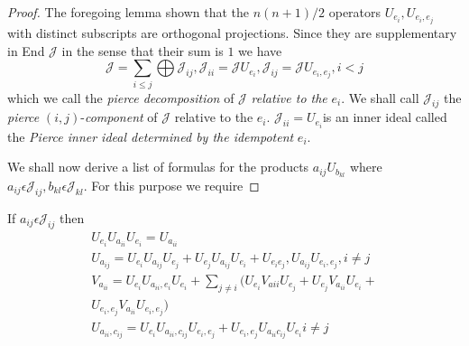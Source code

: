 \begin{proof}
The foregoing lemma shown that the $n(n+1)/2$ operators
$U_{e_{i}},U_{e_{i},e_{j}}$ with distinct subscripts are orthogonal
projections. Since they are supplementary in End $\mathscr{J}$ in the
sense that their sum is $1$ we have
\begin{equation*}
  \mathscr{J}=\sum\limits_{i\le j}\bigoplus
  \mathscr{J}_{ij}, \mathscr{J}_{ii} = \mathscr{J} U_{e_{i}},
  \mathscr{J}_{ij} = \mathscr{J} U_{e_{i},e_{j}},i<j\tag{7}\label{c2:eq7}
\end{equation*}
which we call the {\em pierce decomposition} of $\mathscr{J}$ {\em
  relative to the} $e_i$. We shall call $\mathscr{J}_{ij}$ the {\em
  pierce} $(i,j)$-{\em component} of $\mathscr{J}$ relative to the
$e_i$. $\mathscr{J}_{ii}=U_{e_{i}}$\pageoriginale is an inner ideal
called the {\em 
  Pierce inner ideal determined by the idempotent} $e_i$.

We shall now derive a list of formulas for the products
$a_{ij}U_{b_{kl}}$ where $a_{ij}\epsilon
\mathscr{J}_{ij},b_{kl}\epsilon \mathscr{J}_{kl}$. For this purpose we require
\end{proof}

\begin{lemma}\label{c2:lem2}
If $a_{ij}\epsilon \mathscr{J}_{ij}$ then
\begin{gather*}
  U_{e_{i}}U_{a_{ii}}U_{e_{i}}=U_{a_{ii}}\tag{8}\label{c2:eq8}\\
  U_{a_{ij}}=U_{e_{i}}U_{a_{ij}}U_{e_{j}}+U_{e_{j}} U_{a_{ij}}
  U_{e_{i}} + U_{e_{i}e_{j}},U_{a_{ij}}U_{e_{i},e_{j}},i\neq
  j\tag{9}\label{c2:eq9}\\
  V_{a_{ii}}=U_{e_{i}}U_{a_{ii},e_{i}}U_{e_{i}}+\sum\limits_{j\neq
    i}(U_{e_{i}}V_{aii}U_{e_{j}}+U_{e_{j}}V_{a_{ii}}U_{e_{i}}+\\
  U_{e_{i},e_{j}}V_{a_{ii}}U_{e_{i},e_{j}})\tag{10}\label{c2:eq10}\\
  U_{a_{ii},c_{ij}}=U_{e_{i}}U_{a_{ii},c_{ij}}U_{e_{i},e_{j}} +
  U_{e_{i},e_{j}} U_{a_{ii}c_{ij}}U_{e_{i}}i\neq j\tag{11}\label{c2:eq11}
\end{gather*}
\end{lemma}

